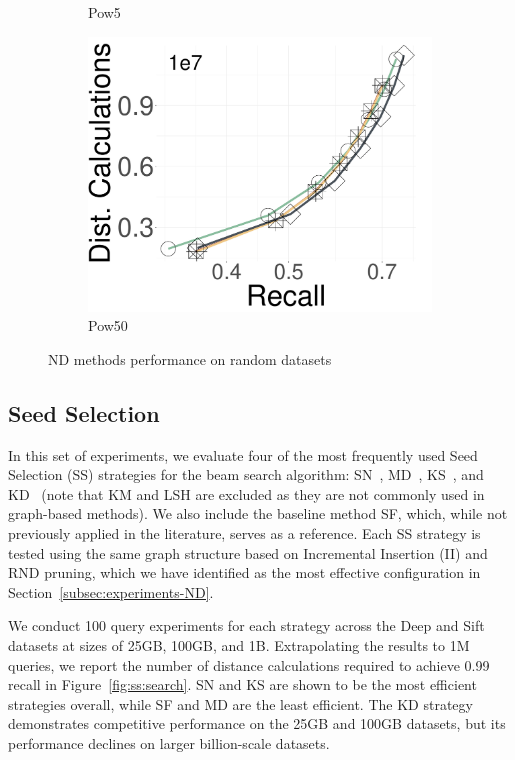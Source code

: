 \begin{figure}[h!]
\begin{subfigure}{0.28\columnwidth}
		\caption{{Pow5}}
		\label{fig:RNG:deep100GB}
		\end{subfigure}	
  \hspace{0.5cm}
		\begin{subfigure}{0.28\columnwidth}
			\centering
			\captionsetup{justification=centering}	
				\includegraphics[width=\textwidth]{../img/Experiments/RNG/DC_POW50n.pdf}
		\caption{{Pow50}}
		\label{fig:RNG:pow50}	
  \end{subfigure}	
		\caption{{ND methods performance on random datasets}}
		\label{fig:RNG:search:pow}

 \end{figure}

\subsection{Seed Selection}
In this set of experiments, we evaluate four of the most frequently used Seed Selection (SS) strategies for the beam search algorithm: SN~\cite{hnsw,elpis}, MD~\cite{nsg,vamana}, KS~\cite{kgraph,nsw11,dpg,vamana,nssg}, and KD~\cite{efanna,SPTAG1,hcnng} (note that KM and LSH are excluded as they are not commonly used in graph-based methods). We also include the baseline method SF, which, while not previously applied in the literature, serves as a reference. Each SS strategy is tested using the same graph structure based on Incremental Insertion (II) and RND pruning, which we have identified as the most effective configuration in Section~\ref{subsec:experiments-ND}.

We conduct 100 query experiments for each strategy across the Deep and Sift datasets at sizes of 25GB, 100GB, and 1B. Extrapolating the results to 1M queries, we report the number of distance calculations required to achieve 0.99 recall in Figure~\ref{fig:ss:search}. SN and KS are shown to be the most efficient strategies overall, while SF and MD are the least efficient. The KD strategy demonstrates competitive performance on the 25GB and 100GB datasets, but its performance declines on larger billion-scale datasets. 

